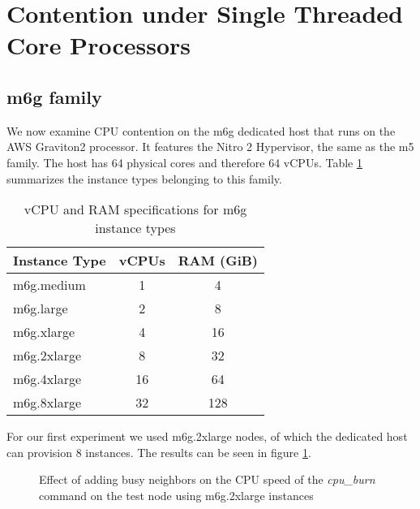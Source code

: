 \section{Contention under Single Threaded Core Processors}
\subsection{m6g family}
We now examine CPU contention on the m6g dedicated host that runs on the AWS Graviton2 
processor. It features the Nitro 2 Hypervisor, the same as the m5 family. The host has 
64 physical cores and therefore 64 vCPUs. Table \ref{tab::m6g_specs} summarizes the instance types 
belonging to this family.
\begin{table}[H]
\centering
\begin{tabular}{l|c|c}
\hline
\textbf{Instance Type} & \textbf{vCPUs} & \textbf{RAM (GiB)} \\
\hline
m6g.medium   & 1  & 4   \\
m6g.large    & 2  & 8   \\
m6g.xlarge   & 4  & 16  \\
m6g.2xlarge  & 8  & 32  \\
m6g.4xlarge  & 16 & 64  \\
m6g.8xlarge  & 32 & 128 \\
\hline
\end{tabular}
\caption{vCPU and RAM specifications for m6g instance types}
\label{tab::m6g_specs}
\end{table}
\noindent
For our first experiment we used m6g.2xlarge nodes, of which the dedicated host can provision 8 
instances. The results can be seen in figure \ref{fig::m6g_2xlarge}. 
\begin{figure}[H]
\centering
{}
\caption{Effect of adding busy neighbors on the CPU speed of the \textit{cpu\_burn} command on the test node using m6g.2xlarge instances}
\label{fig::m6g_2xlarge}
\end{figure}
